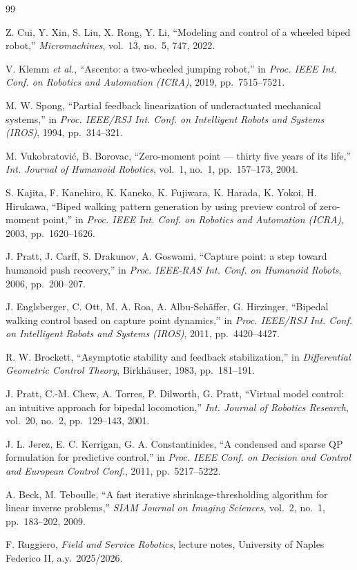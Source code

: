 \documentclass[11pt,a4paper]{article}
\begin{document}
\begin{thebibliography}{99}\small
\setlength{\itemsep}{1pt}

 Z. Cui, Y. Xin, S. Liu, X. Rong, Y. Li, ``Modeling and control of a wheeled biped robot,''
\emph{Micromachines}, vol.~13, no.~5, 747, 2022.

 V. Klemm \emph{et al.}, ``Ascento: a two-wheeled jumping robot,'' in \emph{Proc. IEEE Int. Conf.
on Robotics and Automation (ICRA)}, 2019, pp.~7515--7521.

 M. W. Spong, ``Partial feedback linearization of underactuated mechanical systems,'' in
\emph{Proc. IEEE/RSJ Int. Conf. on Intelligent Robots and Systems (IROS)}, 1994, pp.~314--321.

 M. Vukobratovi\'c, B. Borovac, ``Zero-moment point --- thirty five years of its life,''
\emph{Int. Journal of Humanoid Robotics}, vol.~1, no.~1, pp.~157--173, 2004.

 S. Kajita, F. Kanehiro, K. Kaneko, K. Fujiwara, K. Harada, K. Yokoi, H. Hirukawa, ``Biped
walking pattern generation by using preview control of zero-moment point,'' in \emph{Proc. IEEE Int. Conf. on
Robotics and Automation (ICRA)}, 2003, pp.~1620--1626.

 J. Pratt, J. Carff, S. Drakunov, A. Goswami, ``Capture point: a step toward humanoid push
recovery,'' in \emph{Proc. IEEE-RAS Int. Conf. on Humanoid Robots}, 2006, pp.~200--207.

 J. Englsberger, C. Ott, M. A. Roa, A. Albu-Sch\"affer, G. Hirzinger, ``Bipedal walking
control based on capture point dynamics,'' in \emph{Proc. IEEE/RSJ Int. Conf. on Intelligent Robots and Systems
(IROS)}, 2011, pp.~4420--4427.

 R. W. Brockett, ``Asymptotic stability and feedback stabilization,'' in \emph{Differential
Geometric Control Theory}, Birkh\"auser, 1983, pp.~181--191.

 J. Pratt, C.-M. Chew, A. Torres, P. Dilworth, G. Pratt, ``Virtual model control: an intuitive
approach for bipedal locomotion,'' \emph{Int. Journal of Robotics Research}, vol.~20, no.~2, pp.~129--143, 2001.

 J. L. Jerez, E. C. Kerrigan, G. A. Constantinides, ``A condensed and sparse QP formulation for
predictive control,'' in \emph{Proc. IEEE Conf. on Decision and Control and European Control Conf.}, 2011,
pp.~5217--5222.

 A. Beck, M. Teboulle, ``A fast iterative shrinkage-thresholding algorithm for linear inverse
problems,'' \emph{SIAM Journal on Imaging Sciences}, vol.~2, no.~1, pp.~183--202, 2009.

 F. Ruggiero, \emph{Field and Service Robotics}, lecture notes, University of Naples Federico II,
a.y.~2025/2026.

\end{thebibliography}
\end{document}
